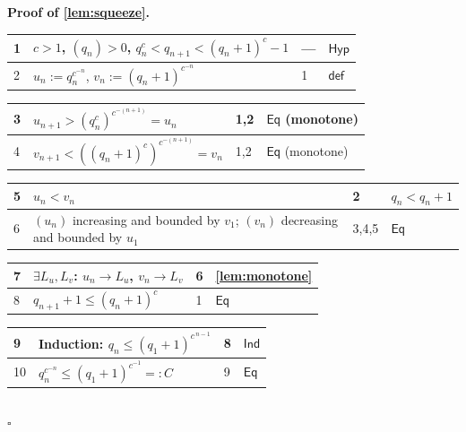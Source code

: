 \documentclass[11pt,reqno]{amsart}
\theoremstyle{blueplain}
\renewcommand{\qedsymbol}{\textcolor{proofqed}{\ensuremath{\square}}}
\renewenvironment{proof}[1][Proof]{\par\noindent\textbf{\textcolor{proofhead}{#1.}}\par\nobreak}{\par\nobreak\hfill\qedsymbol}
\numberwithin{equation}{section}
\begin{document}
\begin{proof}[\textbf{Proof of \cref{lem:squeeze}}]
	\label{proof:lem:squeeze}
	{\scriptsize
		\begin{tabular}{|m{0.7cm}|m{12cm}|m{1.4cm}|m{2.5cm}|}
			\hline
			1 & $c>1$, $(q_n)>0$, $q_n^{c}<q_{n+1}<(q_n+1)^{c}-1$ & --- & $\mathsf{Hyp}$ \\ \hline
			2 & $u_n:=q_n^{c^{-n}}$, $v_n:=(q_n+1)^{c^{-n}}$ & 1 & $\mathsf{def}$ \\
		\end{tabular}%
		\noindent \newline
		\noindent
		\begin{tabular}{|m{0.7cm}|m{12cm}|m{1.4cm}|m{2.5cm}|}
			\hline
			3 & $u_{n+1}>(q_n^{c})^{c^{-(n+1)}}=u_n$ & 1,2 & $\mathsf{Eq}$ (monotone) \\ \hline
			4 & $v_{n+1}<((q_n+1)^{c})^{c^{-(n+1)}}=v_n$ & 1,2 & $\mathsf{Eq}$ (monotone) \\
		\end{tabular}%
		\noindent \newline
		\noindent
		\begin{tabular}{|m{0.7cm}|m{12cm}|m{1.4cm}|m{2.5cm}|}
			\hline
			5 & $u_n<v_n$ & 2 & $q_n<q_n+1$ \\ \hline
			6 & $(u_n)$ increasing and bounded by $v_1$; $(v_n)$ decreasing and bounded by $u_1$ & 3,4,5 & $\mathsf{Eq}$ \\
		\end{tabular}%
		\noindent \newline
		\noindent
		\begin{tabular}{|m{0.7cm}|m{12cm}|m{1.4cm}|m{2.5cm}|}
			\hline
			7 & $\exists L_u,L_v$: $u_n\to L_u$, $v_n\to L_v$ & 6 & \cref{lem:monotone} \\ \hline
			8 & $q_{n+1}+1\le(q_n+1)^c$ & 1 & $\mathsf{Eq}$ \\
		\end{tabular}%
		\noindent \newline
		\noindent
		\begin{tabular}{|m{0.7cm}|m{12cm}|m{1.4cm}|m{2.5cm}|}
			\hline
			9 & Induction: $q_n\le(q_1+1)^{c^{\,n-1}}$ & 8 & $\mathsf{Ind}$ \\ \hline
			10 & $q_n^{c^{-n}}\le(q_1+1)^{c^{-1}}=:C$ & 9 & $\mathsf{Eq}$ \\
		\end{tabular}%
		\noindent \newline
		\noindent
		\begin{tabular}{|m{0.7cm}|m{12cm}|m{1.4cm}|m{2.5cm}|}

\end{tabular}}
\end{proof}
\end{document}

